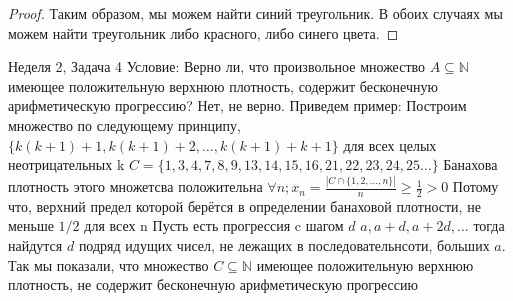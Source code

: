 \documentclass[a4paper,12pt]{article}
\numberwithin{equation}{section}
\theoremstyle{plain}
\theoremstyle{definition}
\theoremstyle{remark}
\def\N{\mathbb {N}}
\begin{document}
\begin{proof}
 \newline

Таким образом, мы можем найти синий треугольник. \newline
В обоих случаях мы можем найти треугольник либо красного, либо синего цвета.



\end{proof}

Неделя 2, Задача 4 \newline
Условие:
Верно ли, что произвольное множество $A\subseteq \N$ имеющее
положительную верхнюю плотность, содержит бесконечную арифметическую прогрессию?
\newline
Нет, не верно.\newline
Приведем пример: \newline
Построим множество по следующему принципу, $\{k(k+1)+1, k(k+1)+2,\ldots,k(k+1)+k+1\}$ \newline
для всех целых неотрицательных k \newline
$C = \{1,3,4,7,8,9,13,14,15,16,21,22,23,24,25 \ldots \} $ \newline
Банахова плотность этого множетсва положительна \newline
$\forall n;  x_n = \frac{|C \cap \{1,2,\ldots,n\}|}{n} \geq \frac{1}{2} > 0$ \newline
Потому что, верхний предел которой берётся в определении банаховой плотности, не меньше $1/2$ для всех n \newline
Пусть есть прогрессия c шагом $d$ \newline
$a,a + d,a + 2d, \ldots$ тогда найдутся $d$ подряд идущих чисел, не лежащих в последовательнсоти, больших $a$. Так мы показали, что множество $C\subseteq \N$ имеющее положительную верхнюю плотность, не содержит бесконечную арифметическую прогрессию
\end{document}
